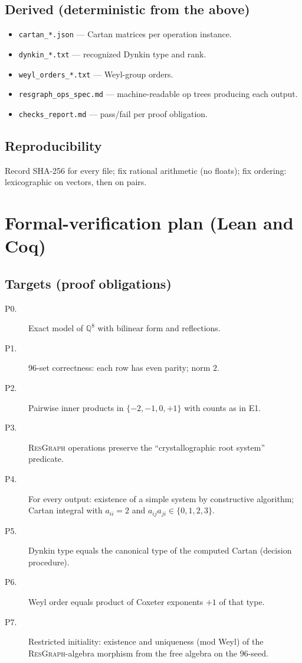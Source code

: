 \documentclass[12pt]{article}
\begin{document}
\subsection*{Derived (deterministic from the above)}
\begin{itemize}\itemsep2pt
  \item \texttt{cartan\_*.json} --- Cartan matrices per operation instance.
  \item \texttt{dynkin\_*.txt} --- recognized Dynkin type and rank.
  \item \texttt{weyl\_orders\_*.txt} --- Weyl-group orders.
  \item \texttt{resgraph\_ops\_spec.md} --- machine-readable op trees producing each output.
  \item \texttt{checks\_report.md} --- pass/fail per proof obligation.
\end{itemize}
\subsection*{Reproducibility}
Record SHA-256 for every file; fix rational arithmetic (no floats); fix ordering: lexicographic on vectors, then on pairs.

\section{Formal-verification plan (Lean and Coq)}
\subsection*{Targets (proof obligations)}
\begin{description}
  \item[P0.] Exact model of $\mathbb Q^8$ with bilinear form and reflections.
  \item[P1.] 96-set correctness: each row has even parity; norm $2$.
  \item[P2.] Pairwise inner products in $\{-2,-1,0,+1\}$ with counts as in E1.
  \item[P3.] \textsc{ResGraph} operations preserve the ``crystallographic root system'' predicate.
  \item[P4.] For every output: existence of a simple system by constructive algorithm; Cartan integral with $a_{ii}=2$ and $a_{ij}a_{ji}\in\{0,1,2,3\}$.
  \item[P5.] Dynkin type equals the canonical type of the computed Cartan (decision procedure).
  \item[P6.] Weyl order equals product of Coxeter exponents $+1$ of that type.
  \item[P7.] Restricted initiality: existence and uniqueness (mod Weyl) of the \textsc{ResGraph}-algebra morphism from the free algebra on the 96-seed.
\end{description}
\end{document}
